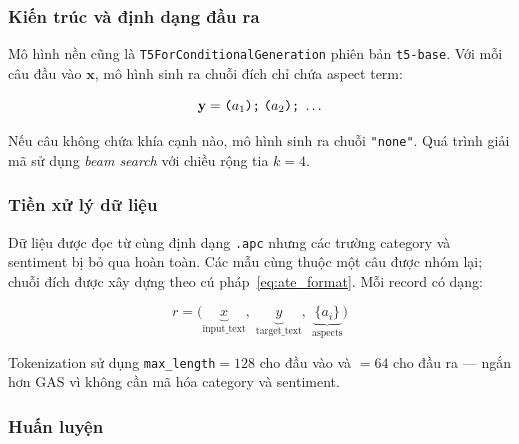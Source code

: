 \subsubsection{Kiến trúc và định dạng đầu ra}
\label{subsubsec:t5ate_arch}

Mô hình nền cũng là \texttt{T5ForConditionalGeneration} phiên bản
\texttt{t5-base}.  Với mỗi câu đầu vào $\mathbf{x}$, mô hình sinh ra
chuỗi đích chỉ chứa aspect term:

\begin{equation}
  \mathbf{y} = \texttt{(}a_1\texttt{);\;(}a_2\texttt{);\;} \dots
  \label{eq:ate_format}
\end{equation}

\noindent Nếu câu không chứa khía cạnh nào, mô hình sinh ra chuỗi
\texttt{"none"}.  Quá trình giải mã sử dụng \textit{beam search} với
chiều rộng tia $k = 4$.

\subsubsection{Tiền xử lý dữ liệu}
\label{subsubsec:t5ate_data}

Dữ liệu được đọc từ cùng định dạng \texttt{.apc} nhưng các trường
category và sentiment bị bỏ qua hoàn toàn.  Các mẫu cùng thuộc một
câu được nhóm lại; chuỗi đích được xây dựng theo
cú pháp~\eqref{eq:ate_format}.  Mỗi record có dạng:

\begin{equation}
  r = \bigl(\underbrace{x}_{\text{input\_text}},\;
            \underbrace{y}_{\text{target\_text}},\;
            \underbrace{\{a_i\}}_{\text{aspects}}
      \bigr)
  \label{eq:ate_record}
\end{equation}

Tokenization sử dụng \texttt{max\_length}$= 128$ cho đầu vào và
$= 64$ cho đầu ra — ngắn hơn GAS vì không cần mã hóa category và
sentiment.

\subsubsection{Huấn luyện}
\label{subsubsec:t5ate_train}

